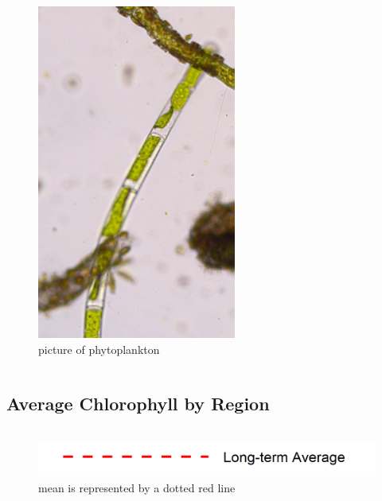 \documentclass[
]{book}
\begin{document}
\begin{columns-nocenter}
\begin{column}
\begin{figure}
{\centering \includegraphics[width=2.57in]{figures/phyto} 

}

\caption{picture of phytoplankton}\label{fig:unnamed-chunk-18}
\end{figure}

\end{column}

\end{columns-nocenter}

\hypertarget{average-chlorophyll-by-region}{%
\subsection{Average Chlorophyll by Region}\label{average-chlorophyll-by-region}}

\begin{columns-nocenter}

\begin{column}

\begin{figure}
\includegraphics[width=15.25in]{figures/mline} \caption{mean is represented by a dotted red line}\label{fig:unnamed-chunk-19}
\end{figure}

\end{column}

\begin{column}

\end{column}

\begin{column}

\end{column}

\end{columns-nocenter}
\end{document}
